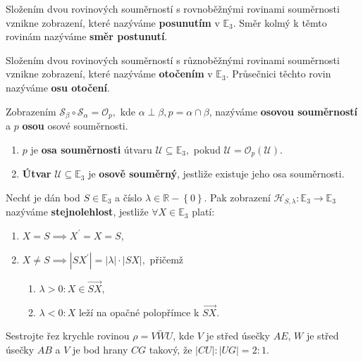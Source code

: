 \begin{definition}
    Složením dvou rovinových souměrností s rovnoběžnými rovinami souměrnosti vznikne
    zobrazení, které nazýváme \textbf{posunutím} v $\mathbb E_3.$ Směr kolmý k těmto
    rovinám nazýváme \textbf{směr postunutí}.
\end{definition}

\begin{definition}
    Složením dvou rovinových souměrností s různoběžnými rovinami souměrnosti vznikne
    zobrazení, které nazýváme \textbf{otočením} v $\mathbb E_3.$ Průsečnici těchto
    rovin nazýváme \textbf{osu otočení}.
\end{definition}

\begin{definition}
    Zobrazením $\mathscr S_\beta \circ \mathscr S_\alpha = \mathscr O_p,$ kde
    $\alpha \perp \beta, p=\alpha \cap \beta$, nazýváme \textbf{osovou souměrností}
    a $p$ \textbf{osou} osové souměrnosti.
\end{definition}

\begin{definition}
\begin{enumerate}[$i.$]
\item $p$ je \textbf{osa souměrnosti} útvaru $\mathscr U\subseteq \mathbb E_3,$
pokud $\mathscr U = \mathscr O_p(\mathscr U).$
\item \textbf{Útvar} $\mathscr U \subseteq \mathbb E_3$ je \textbf{osově souměrný},
jestliže existuje jeho osa souměrnosti.
\end{enumerate}
\end{definition}

\begin{definition}
    Nechť je dán bod $S\in \mathbb E_3$ a číslo $\lambda \in \mathbb R - \left \{ 0
    \right \}. $ Pak zobrazení $\mathscr H_{S,\lambda}: \mathbb E_3 \to \mathbb E_3$
   nazýváme \textbf{stejnolehlost}, jestliže $\forall X \in \mathbb E_3$ platí:
   \begin{enumerate}[$i.$]
   \item $X=S\implies X^\prime =X=S$,
  	\item $X\ne S\implies |SX^\prime| = |\lambda|\cdot |SX|,$ přičemž
   \begin{enumerate}[$a.$]
   \item $\lambda > 0: X\in \overrightarrow{SX},$
  	\item $\lambda < 0: X$ leží na opačné polopřímce k $\overrightarrow{SX}.$
   \end{enumerate}
   \end{enumerate}
\end{definition}

\begin{priklad}
Sestrojte řez krychle rovinou $\rho=\overleftrightarrow{VWU}$, kde $V$ je střed
úsečky $AE$, $W$ je střed úsečky $AB$ a $V$ je bod hrany $CG$ takový, že $|CU|:|UG|=2:1$.
\end{priklad}
